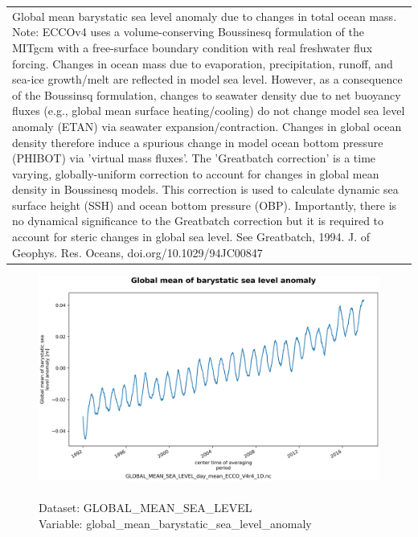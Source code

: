 \begin{longtable}{|p{}|p{}|p{}|p{}|}
\rowcolor{lightgray} \multicolumn{4}{|p{1.00\textwidth}|}{\textbf{Comments}} \\ \hline
\multicolumn{4}{|p{1\textwidth}|}{Global mean barystatic sea level anomaly due to changes in total ocean mass. Note: ECCOv4 uses a volume-conserving Boussinesq formulation of the MITgcm with a free-surface boundary condition with real freshwater flux forcing. Changes in ocean mass due to evaporation, precipitation, runoff, and sea-ice growth/melt are reflected in model sea level. However, as a consequence of the Boussinsq formulation, changes to seawater density due to net buoyancy fluxes (e.g., global mean surface heating/cooling) do not change model sea level anomaly (ETAN) via seawater expansion/contraction. Changes in global ocean density therefore induce a spurious change in model ocean bottom pressure (PHIBOT) via 'virtual mass fluxes'. The 'Greatbatch correction' is a time varying, globally-uniform correction to account for changes in global mean density in Boussinesq models. This correction is used to calculate dynamic sea surface height (SSH) and ocean bottom pressure (OBP). Importantly, there is no dynamical significance to the Greatbatch correction but it is required to account for steric changes in global sea level. See Greatbatch, 1994. J. of Geophys. Res. Oceans, doi.org/10.1029/94JC00847} \\ \hline
\end{longtable}

\begin{figure}[H]
\centering
\includegraphics[scale=0.5]{../images/plots/oneD_plots/Global_Mean_Sea_Level/global_mean_barystatic_sea_level_anomaly.png}
\caption{\\Dataset: GLOBAL\_MEAN\_SEA\_LEVEL\\Variable: global\_mean\_barystatic\_sea\_level\_anomaly}
\label{tab:table-GLOBAL_MEAN_SEA_LEVEL_global_mean_barystatic_sea_level_anomaly-Plot}
\end{figure}
\pagebreak
